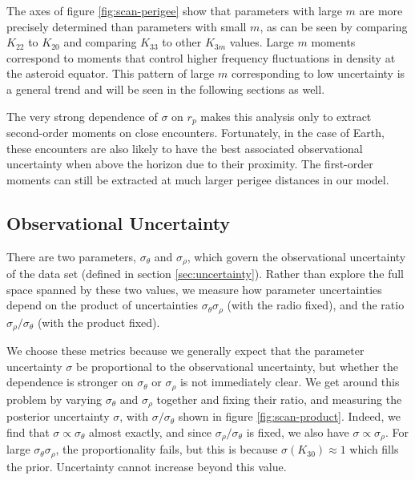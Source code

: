 \documentclass[fleqn,usenatbib]{mnras}
\begin{document}
The axes of figure \ref{fig:scan-perigee} show that parameters with large $m$ are more precisely determined than parameters with small $m$, as can be seen by comparing $K_{22}$ to $K_{20}$ and comparing $K_{33}$ to other $K_{3m}$ values. Large $m$ moments correspond to moments that control higher frequency fluctuations in density at the asteroid equator. This pattern of large $m$ corresponding to low uncertainty is a general trend and will be seen in the following sections as well.

The very strong dependence of $\sigma$ on $r_p$ makes this analysis only to extract second-order moments on close encounters. Fortunately, in the case of Earth, these encounters are also likely to have the best associated observational uncertainty when above the horizon due to their proximity. The first-order moments can still be extracted at much larger perigee distances in our model.


\subsection{Observational Uncertainty}
\label{sec:scan-uncertainty}
There are two parameters, $\sigma_\theta$ and $\sigma_\rho$, which govern the observational uncertainty of the data set (defined in section \ref{sec:uncertainty}). Rather than explore the full space spanned by these two values, we measure how parameter uncertainties depend on the product of uncertainties $\sigma_\theta\sigma_\rho$ (with the radio fixed), and the ratio $\sigma_\rho / \sigma_\theta$ (with the product fixed).

We choose these metrics because we generally expect that the parameter uncertainty $\sigma$ be proportional to the observational uncertainty, but whether the dependence is stronger on $\sigma_\theta$ or $\sigma_\rho$ is not immediately clear. We get around this problem by varying $\sigma_\theta$ and $\sigma_\rho$ together and fixing their ratio, and measuring the posterior uncertainty $\sigma$, with $\sigma/\sigma_\theta$ shown in figure \ref{fig:scan-product}. Indeed, we find that $\sigma \propto \sigma_\theta$ almost exactly, and since $\sigma_\rho / \sigma_\theta$ is fixed, we also have $\sigma \propto \sigma_\rho$. For large $\sigma_\theta \sigma_\rho$, the proportionality fails, but this is because $\sigma(K_{30}) \approx 1$ which fills the prior. Uncertainty cannot increase beyond this value.
\end{document}
